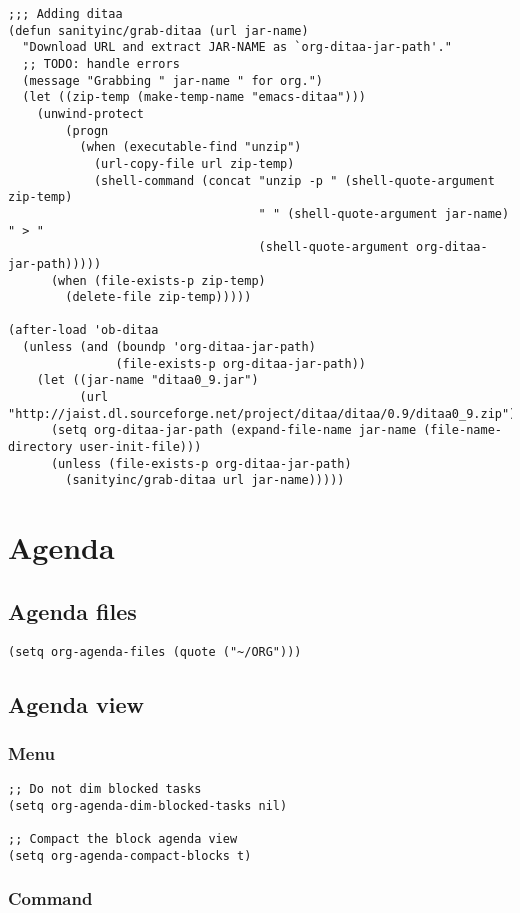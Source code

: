 \documentclass[11pt]{scrartcl}
\begin{document}
\begin{verbatim}
;;; Adding ditaa
(defun sanityinc/grab-ditaa (url jar-name)
  "Download URL and extract JAR-NAME as `org-ditaa-jar-path'."
  ;; TODO: handle errors
  (message "Grabbing " jar-name " for org.")
  (let ((zip-temp (make-temp-name "emacs-ditaa")))
    (unwind-protect
        (progn
          (when (executable-find "unzip")
            (url-copy-file url zip-temp)
            (shell-command (concat "unzip -p " (shell-quote-argument zip-temp)
                                   " " (shell-quote-argument jar-name) " > "
                                   (shell-quote-argument org-ditaa-jar-path)))))
      (when (file-exists-p zip-temp)
        (delete-file zip-temp)))))

(after-load 'ob-ditaa
  (unless (and (boundp 'org-ditaa-jar-path)
               (file-exists-p org-ditaa-jar-path))
    (let ((jar-name "ditaa0_9.jar")
          (url "http://jaist.dl.sourceforge.net/project/ditaa/ditaa/0.9/ditaa0_9.zip"))
      (setq org-ditaa-jar-path (expand-file-name jar-name (file-name-directory user-init-file)))
      (unless (file-exists-p org-ditaa-jar-path)
        (sanityinc/grab-ditaa url jar-name)))))
\end{verbatim}

\section{Agenda}
\label{sec:orgheadline15}
\subsection{Agenda files}
\label{sec:orgheadline6}
\begin{verbatim}
(setq org-agenda-files (quote ("~/ORG")))
\end{verbatim}
\subsection{Agenda view}
\label{sec:orgheadline13}
\subsubsection{Menu}
\label{sec:orgheadline7}
\begin{verbatim}
;; Do not dim blocked tasks
(setq org-agenda-dim-blocked-tasks nil)

;; Compact the block agenda view
(setq org-agenda-compact-blocks t)
\end{verbatim}
\subsubsection{Command}
\label{sec:orgheadline8}
\end{document}
